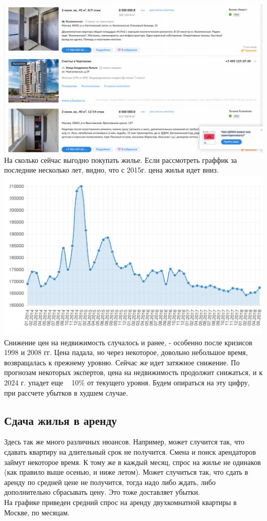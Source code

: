 \includegraphics[width=16cm]{pics/ruslan/1.png}
На сколько сейчас выгодно покупать жилье. Если рассмотреть граффик за последние несколько лет, видно, что с 2015г. цена жилья идет вниз.
\includegraphics[width=14.5cm]{pics/ruslan/2.png}
Снижение цен на недвижимость случалось и ранее, - особенно после кризисов 1998 и 2008 гг. Цена падала, но через некоторое, довольно небольшое время, возвращалась к прежнему уровню. Сейчас же идет затяжное снижение. По прогнозам некоторых экспертов, цена на недвижимость продолжит снижаться, и к 2024 г. упадет еще ~ 10\% от текущего уровня. Будем опираться на эту цифру, при рассчете убытков в худшем случае.

\subsection{Сдача жилья в аренду}
Здесь так же много различных нюансов. Например, может случится так, что сдавать квартиру на длительный срок не получится. Смена и поиск арендаторов займут некоторое время. К тому же в каждый месяц, спрос на жилье не одинаков (как правило выше осенью, и ниже летом). Может случиться так, что сдать в аренду по средней цене не получится, тогда надо либо ждать, либо дополнительно сбрасывать цену. Это тоже доставляет убытки. \\
На графике приведен средний спрос на аренду двухкомнатной квартиры в Москве, по месяцам.

